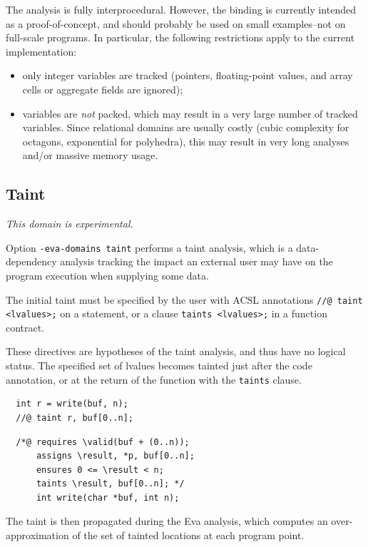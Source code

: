 \documentclass[web]{frama-c-book}
\begin{document}
The analysis is fully interprocedural. However, the binding is
currently intended as a proof-of-concept, and should probably be used
on small examples--not on full-scale programs. In particular, the
following restrictions apply to the current implementation:
\begin{itemize}
\item only integer variables are tracked (pointers, floating-point values,
  and array cells or aggregate fields are ignored);

\item variables are \emph{not} packed, which may result in a very large
number of tracked variables. Since relational domains are usually costly
(cubic complexity for octagons, exponential for polyhedra), this may result
in very long analyses and/or massive memory usage.
  
\end{itemize}

\subsection{Taint}
\label{sec:taint}

\emph{This domain is experimental.}

Option \texttt{-eva-domains taint} performs a taint analysis, which is a
data-dependency analysis tracking the impact an external user may have on
the program execution when supplying some data.

The initial taint must be specified by the user with ACSL annotations
\lstinline|//@ taint <lvalues>;| on a statement, or a clause
\lstinline|taints <lvalues>;| in a function contract.

These directives are hypotheses of the taint analysis, and thus have no logical
status. The specified set of lvalues becomes tainted just after the code
annotation, or at the return of the function with the \texttt{taints} clause.

\begin{lstlisting}
  int r = write(buf, n);
  //@ taint r, buf[0..n];
\end{lstlisting}

\begin{lstlisting}
  /*@ requires \valid(buf + (0..n));
      assigns \result, *p, buf[0..n];
      ensures 0 <= \result < n;
      taints \result, buf[0..n]; */
      int write(char *buf, int n);
\end{lstlisting}

The taint is then propagated during the Eva analysis, which computes an
over-approximation of the set of tainted locations at each program point.
\end{document}
